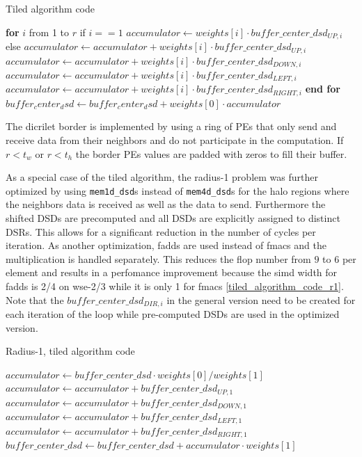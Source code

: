 \documentclass{article}
\begin{document}
\begin{algorithm}
    \caption{Tiled algorithm code}
    \begin{algorithmic}[1]
        \State \textbf{for} $i$ from 1 to $r$
        \State \quad if $i==1$
        \State \quad \quad $accumulator \gets weights[i] \cdot buffer\_center\_dsd_{UP,i}$
        \State \quad else
        \State \quad \quad $accumulator \gets accumulator + weights[i] \cdot buffer\_center\_dsd_{UP,i}$
        \State \quad $accumulator \gets accumulator + weights[i] \cdot buffer\_center\_dsd_{DOWN,i}$
        \State \quad $accumulator \gets accumulator + weights[i] \cdot buffer\_center\_dsd_{LEFT,i}$
        \State \quad $accumulator \gets accumulator + weights[i] \cdot buffer\_center\_dsd_{RIGHT,i}$
        \State \textbf{end for}
        \State \quad $buffer_center_dsd \gets buffer_center_dsd + weights[0] \cdot accumulator$
    \end{algorithmic}
\end{algorithm}

The dicrilet border is implemented by using a ring of PEs that only send and receive data from their neighbors and do not participate in the computation. If $r<t_w$ or $r<t_h$ the border PEs values are padded with zeros to fill their buffer.

As a special case of the tiled algorithm, the radius-1 problem was further optimized by using \texttt{mem1d\_dsd}s instead of \texttt{mem4d\_dsd}s for the halo regions where the neighbors data is received as well as the data to send. Furthermore the shifted DSDs are precomputed and all DSDs are explicitly assigned to distinct DSRs. This allows for a significant reduction in the number of cycles per iteration. As another optimization, fadds are used instead of fmacs and the multiplication is handled separately. This reduces the flop number from $9$ to $6$ per element and results in a perfomance improvement because the simd width for fadds is 2/4 on wse-2/3 while it is only 1 for fmacs \ref{tiled_algorithm_code_r1}. Note that the $buffer\_center\_dsd_{DIR,i}$ in the general version need to be created for each iteration of the loop while pre-computed DSDs are used in the optimized version.

\begin{algorithm}
    \caption{Radius-1, tiled algorithm code}
    \begin{algorithmic}[1]
        \State $accumulator \gets buffer\_center\_dsd \cdot weights[0]/weights[1]$
        \State $accumulator \gets accumulator + buffer\_center\_dsd_{UP,1}$
        \State $accumulator \gets accumulator + buffer\_center\_dsd_{DOWN,1}$
        \State $accumulator \gets accumulator + buffer\_center\_dsd_{LEFT,1}$
        \State $accumulator \gets accumulator + buffer\_center\_dsd_{RIGHT,1}$
        \State $buffer\_center\_dsd \gets buffer\_center\_dsd + accumulator \cdot weights[1]$
    \end{algorithmic}
\end{algorithm}
\end{document}
